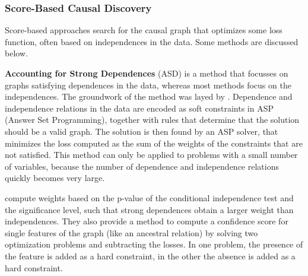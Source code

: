 

    
\subsubsection*{Score-Based Causal Discovery}
Score-based approaches search for the causal graph that optimizes some loss function, often based on independences in the data. Some methods are discussed below.

\textbf{Accounting for Strong Dependences} (ASD) is a method that focusses on graphs satisfying dependences in the data, whereas most methods focus on the independences. The groundwork of the method was layed by \citet{hyttinen2014constraint}. Dependence and independence relations in the data are encoded as soft constraints in ASP (Answer Set Programming), together with rules that determine that the solution should be a valid graph. The solution is then found by an ASP solver, that minimizes the loss computed as the sum of the weights of the constraints that are not satisfied. This method can only be applied to problems with a small number of variables, because the number of dependence and independence relations quickly becomes very large.

\citet{magliacane2016ancestral} compute weights based on the p-value of the conditional independence test and the significance level, such that strong dependences obtain a larger weight than independences. They also provide a method to compute a confidence score for single features of the graph (like an ancestral relation) by solving two optimization problems and subtracting the losses. In one problem, the presence of the feature is added as a hard constraint, in the other the absence is added as a hard constraint. 

